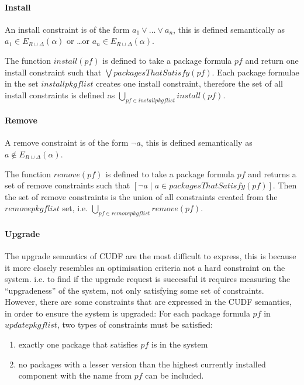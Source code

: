 \paragraph{Install}
An install constraint is of the form $a_1 \vee \ldots \vee a_n$,
this is defined semantically as $a_1 \in E_{R \cup \Delta}(\alpha)$ or \ldots or $a_n \in E_{R \cup \Delta}(\alpha)$.

The function  $install(pf)$ is defined to take a package formula $pf$ and return one install constraint such that $\bigvee packagesThatSatisfy(pf)$.
Each package formulae in the set $installpkgflist$ creates one install constraint,
therefore the set of all install constraints is defined as $\bigcup \limits_{pf \in installpkgflist} install(pf)$.

\paragraph{Remove}
A remove constraint is of the form $\neg a$,
this is defined semantically as $a \not \in E_{R \cup \Delta}(\alpha)$.

The function $remove(pf)$ is defined to take a package formula $pf$ and returns a set of remove constraints such that $[\neg a \mid  a \in packagesThatSatisfy(pf)]$.
Then the set of remove constraints is the union of all constraints created from the $removepkgflist$ set, i.e. $\bigcup \limits_{pf \in removepkgflist} remove(pf)$.

\paragraph{Upgrade}
The upgrade semantics of CUDF are the most difficult to express, this is because it more closely resembles an optimisation criteria not a hard constraint on the system.
i.e. to find if the upgrade request is successful it requires measuring the ``upgradeness'' of the system, not only satisfying some set of constraints.
However, there are some constraints that are expressed in the CUDF semantics, in order to ensure the system is upgraded:
For each package formula $pf$ in $updatepkgflist$, two types of constraints must be satisfied:
\begin{enumerate}
  \item exactly one package that satisfies $pf$ is in the system
  \item no packages with a lesser version than the highest currently installed component with the name from $pf$ can be included.
\end{enumerate} 

